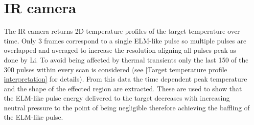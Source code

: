 

\section{IR camera}\label{IR camera}
The IR camera returns 2D temperature profiles of the target temperature over time. Only 3 frames correspond to a single ELM-like pulse so multiple pulses are overlapped and averaged to increase the resolution aligning all pulses peak as done by Li.\cite{Li2020} To avoid being affected by thermal transients only the last 150 of the 300 pulses within every scan is considered (see \autoref{Target temperature profile interpretation} for details). From this data the time dependent peak temperature and the shape of the effected region are extracted. These are used to show that the ELM-like pulse energy delivered to the target decreases with increasing neutral pressure to the point of being negligible therefore achieving the baffling of the ELM-like pulse.


